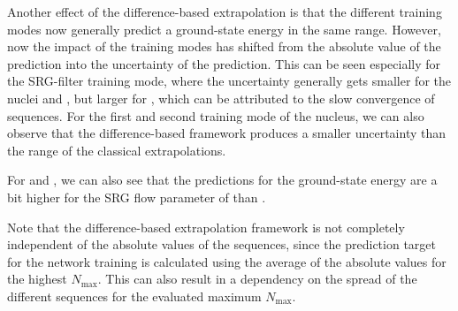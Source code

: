 


Another effect of the difference-based extrapolation is that the different training modes now generally predict a ground-state energy in the same range. However, now the impact of the training modes has shifted from the absolute value of the prediction into the uncertainty of the prediction. This can be seen especially for the SRG-filter training mode, where the uncertainty generally gets smaller for the nuclei  and , but larger for , which can be attributed to the slow convergence of  sequences.
For the first and second training mode of the  nucleus, we can also observe that the difference-based framework produces a smaller uncertainty than the range of the classical extrapolations.

For  and , we can also see that the predictions for the ground-state energy are a bit higher for the SRG flow parameter of  than .

Note that the difference-based extrapolation framework is not completely independent of the absolute values of the sequences, since the prediction target for the network training is calculated using the average of the absolute values for the highest $N_\mathrm{max}$. This can also result in a dependency on the spread of the different sequences for the evaluated maximum $N_\mathrm{max}$.

